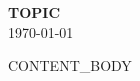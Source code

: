 \documentclass[12pt]{article}
\begin{document}
\begin{center}
    \textbf{\Large {{TOPIC}}} \\
    \vspace{0.2cm}
    \today
\end{center}

\vspace{0.5cm}

{{CONTENT_BODY}}
\end{document}

